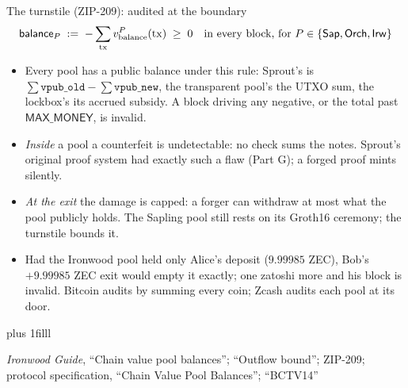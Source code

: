 \documentclass[aspectratio=169,11pt]{beamer}
\newcommand{\src}[1]{\par\vskip0pt plus 1filll
  {\fontsize{6}{7.2}\selectfont\color{arbdim}\raggedright #1\par}}
\begin{document}
\begin{frame}{The turnstile (ZIP-209): audited at the boundary}
\vspace*{-6pt}
\[
  \mathsf{balance}_{P} \;:=\; -\sum_{\mathrm{tx}} v_{\mathrm{balance}}^{P}(\mathrm{tx})
  \;\ge\; 0
  \quad\text{in every block, for }
  P \in \{\mathsf{Sap}, \mathsf{Orch}, \mathsf{Irw}\}
\]
\small
\begin{itemize}
  \item Every pool has a public balance under this rule: Sprout's is
    $\sum \mathtt{vpub\_old} - \sum \mathtt{vpub\_new}$, the transparent
    pool's the UTXO sum, the lockbox's its accrued subsidy. A block
    driving any negative, or the total past $\mathsf{MAX\_MONEY}$, is
    invalid.
  \item \emph{Inside} a pool a counterfeit is undetectable: no check sums
    the notes. Sprout's original proof system had exactly such a flaw
    (Part G); a forged proof mints silently.
  \item \emph{At the exit} the damage is capped: a forger can withdraw at
    most what the pool publicly holds. The Sapling pool still rests on
    its Groth16 ceremony; the turnstile bounds it.
  \item Had the Ironwood pool held only Alice's deposit ($9.99985$ ZEC),
    Bob's $+9.99985$ ZEC exit would empty it exactly; one zatoshi more
    and his block is invalid. Bitcoin audits by summing every coin;
    Zcash audits each pool at its door.
\end{itemize}
\src{\emph{Ironwood Guide}, ``Chain value pool balances''; ``Outflow bound'';
  ZIP-209; protocol specification, ``Chain Value Pool Balances''; ``BCTV14''}
\end{frame}
\end{document}
